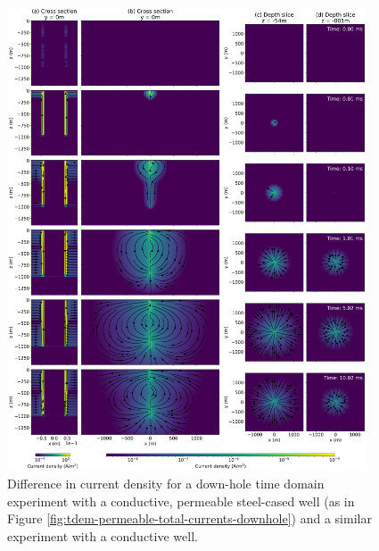 \begin{figure}
    \begin{center}
    \includegraphics[width=0.95\textwidth]{figures/em_casing/tdem-permeable-secondary-currents-downhole.png}
    \end{center}
\caption{
    Difference in current density for a down-hole time domain experiment with a conductive,
    permeable steel-cased well (as in Figure \ref{fig:tdem-permeable-total-currents-downhole}) and a similar experiment with a conductive well.
}
\label{fig:tdem-permeable-secondary-currents-downhole}
\end{figure}



